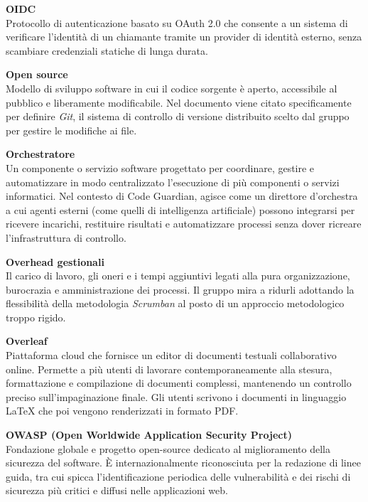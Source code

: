 \documentclass[12pt, a4paper]{article}
\begin{document}
\noindent\hypertarget{oidc}{\textbf{OIDC}} \\[0.1em]
Protocollo di autenticazione basato su OAuth 2.0 che consente a un sistema di verificare l'identità di un chiamante tramite un provider di identità esterno, senza scambiare credenziali statiche di lunga durata.
\vspace{0.5cm}

\noindent\hypertarget{open-source}{\textbf{Open source}} \\[0.1em]
Modello di sviluppo software in cui il codice sorgente è aperto, accessibile al pubblico e liberamente modificabile. Nel documento viene citato specificamente per definire \textit{Git}, il sistema di controllo di versione distribuito scelto dal gruppo per gestire le modifiche ai file.
\vspace{0.5cm}  

\noindent\hypertarget{orchestratore}{\textbf{Orchestratore}} \\[0.1em]
Un componente o servizio software progettato per coordinare, gestire e automatizzare in modo centralizzato l'esecuzione di più componenti o servizi informatici. Nel contesto di Code Guardian, agisce come un direttore d'orchestra a cui agenti esterni (come quelli di intelligenza artificiale) possono integrarsi per ricevere incarichi, restituire risultati e automatizzare processi senza dover ricreare l'infrastruttura di controllo.
\vspace{0.5cm}

\noindent\hypertarget{overhead-gestionali}{\textbf{Overhead gestionali}} \\[0.1em]
Il carico di lavoro, gli oneri e i tempi aggiuntivi legati alla pura organizzazione, burocrazia e amministrazione dei processi. Il gruppo mira a ridurli adottando la flessibilità della metodologia \textit{Scrumban} al posto di un approccio metodologico troppo rigido.
\vspace{0.5cm}  

\noindent\hypertarget{overleaf}{\textbf{Overleaf}} \\[0.1em]
Piattaforma cloud che fornisce un editor di documenti testuali collaborativo online. Permette a più utenti di lavorare contemporaneamente alla stesura, formattazione e compilazione di documenti complessi, mantenendo un controllo preciso sull'impaginazione finale. Gli utenti scrivono i documenti in linguaggio LaTeX che poi vengono renderizzati in formato PDF.
\vspace{0.5cm}

\noindent\hypertarget{owasp}{\textbf{OWASP (Open Worldwide Application Security Project)}} \\[0.1em]
Fondazione globale e progetto open-source dedicato al miglioramento della sicurezza del software. È internazionalmente riconosciuta per la redazione di linee guida, tra cui spicca l'identificazione periodica delle vulnerabilità e dei rischi di sicurezza più critici e diffusi nelle applicazioni web.
\vspace{0.1cm}
\newpage
\end{document}

